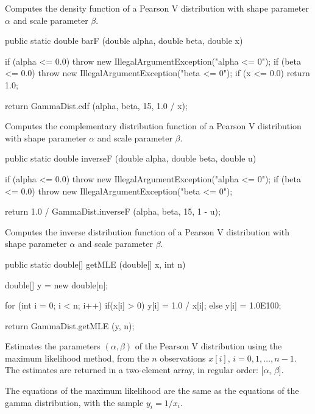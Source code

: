 \begin{tabb}
   Computes the density function of a Pearson V distribution with shape
parameter $\alpha$
   and scale parameter $\beta$.
\end{tabb}
\begin{code}

   public static double barF (double alpha, double beta, double x)\begin{hide} {
      if (alpha <= 0.0)
         throw new IllegalArgumentException("alpha <= 0");
      if (beta <= 0.0)
         throw new IllegalArgumentException("beta <= 0");
      if (x <= 0.0)
         return 1.0;

      return GammaDist.cdf (alpha, beta, 15, 1.0 / x);
   }\end{hide}
\end{code}
\begin{tabb}
   Computes the complementary distribution function of a Pearson V distribution
   with shape parameter $\alpha$ and scale parameter $\beta$.
\end{tabb}
\begin{code}

   public static double inverseF (double alpha, double beta, double u)\begin{hide} {
      if (alpha <= 0.0)
         throw new IllegalArgumentException("alpha <= 0");
      if (beta <= 0.0)
         throw new IllegalArgumentException("beta <= 0");

      return 1.0 / GammaDist.inverseF (alpha, beta, 15, 1 - u);
   }\end{hide}
\end{code}
\begin{tabb}
   Computes the inverse distribution function of a Pearson V distribution
   with shape parameter $\alpha$ and scale parameter $\beta$.
\end{tabb}
\begin{code}

   public static double[] getMLE (double[] x, int n)\begin{hide} {
      double[] y = new double[n];

      for (int i = 0; i < n; i++) {
	 if(x[i] > 0)
	     y[i] = 1.0 / x[i];
	 else
	     y[i] = 1.0E100;
      }

      return GammaDist.getMLE (y, n);
   }\end{hide}
\end{code}
\begin{tabb}
   Estimates the parameters $(\alpha,\beta)$ of the Pearson V distribution
   using the maximum likelihood method, from the $n$ observations
   $x[i]$, $i = 0, 1,\ldots, n-1$. The estimates are returned in a two-element
    array, in regular order: [$\alpha$, $\beta$].
   \begin{detailed}
   The equations of the maximum likelihood are the same as the equations of
   the gamma distribution, with the sample $y_i = 1/x_i$.
 \end{detailed}
\end{tabb}
